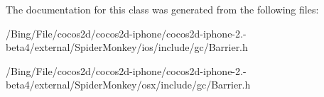 The documentation for this class was generated from the following files\-:\begin{DoxyCompactItemize}
\item 
/\-Bing/\-File/cocos2d/cocos2d-\/iphone/cocos2d-\/iphone-\/2.-\/beta4/external/\-Spider\-Monkey/ios/include/gc/Barrier.\-h\item 
/\-Bing/\-File/cocos2d/cocos2d-\/iphone/cocos2d-\/iphone-\/2.-\/beta4/external/\-Spider\-Monkey/osx/include/gc/Barrier.\-h\end{DoxyCompactItemize}
